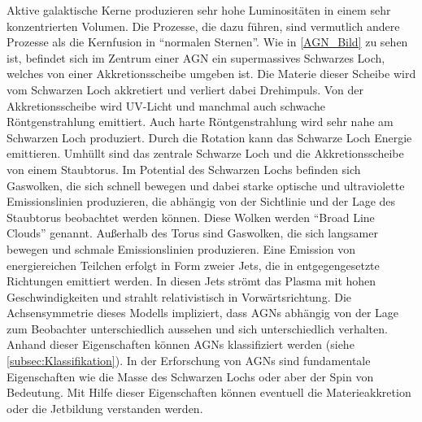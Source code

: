 
Aktive galaktische Kerne produzieren sehr hohe Luminositäten in einem sehr konzentrierten Volumen.
Die Prozesse, die dazu führen, sind vermutlich andere Prozesse als die Kernfusion in ``normalen Sternen''.
Wie in \autoref{AGN_Bild} zu sehen ist, befindet sich im Zentrum einer AGN ein supermassives Schwarzes Loch, welches von einer Akkretionsscheibe umgeben ist.
Die Materie dieser Scheibe wird vom Schwarzen Loch akkretiert und verliert dabei Drehimpuls.
Von der Akkretionsscheibe wird UV-Licht und manchmal auch schwache Röntgenstrahlung emittiert.
Auch harte Röntgenstrahlung wird sehr nahe am Schwarzen Loch produziert.
Durch die Rotation kann das Schwarze Loch Energie emittieren.
Umhüllt sind das zentrale Schwarze Loch und die Akkretionsscheibe von einem Staubtorus.
Im Potential des Schwarzen Lochs befinden sich Gaswolken, die sich schnell bewegen und dabei starke optische und ultraviolette Emissionslinien produzieren, die abhängig von der Sichtlinie und der Lage des Staubtorus beobachtet werden können. 
Diese Wolken werden ``Broad Line Clouds'' genannt.
Außerhalb des Torus sind Gaswolken, die sich langsamer bewegen und schmale Emissionslinien produzieren.
Eine Emission von energiereichen Teilchen erfolgt in Form zweier Jets, die in entgegengesetzte Richtungen emittiert werden.
In diesen Jets strömt das Plasma mit hohen Geschwindigkeiten und strahlt relativistisch in Vorwärtsrichtung.
Die Achsensymmetrie dieses Modells impliziert, dass AGNs abhängig von der Lage zum Beobachter unterschiedlich aussehen und sich unterschiedlich verhalten.
Anhand dieser Eigenschaften können AGNs klassifiziert werden (siehe \autoref{subsec:Klassifikation}).
In der Erforschung von AGNs sind fundamentale Eigenschaften wie die Masse des Schwarzen Lochs oder aber der Spin von Bedeutung.
Mit Hilfe dieser Eigenschaften können eventuell die Materieakkretion oder die Jetbildung verstanden werden.\cite{Urry_Padovani}


